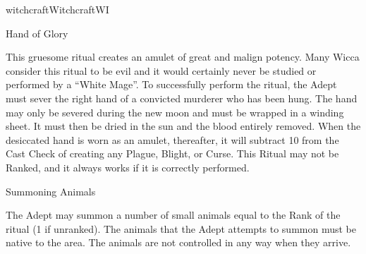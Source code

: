 \begin{college}[1.1]{witchcraft}{Witchcraft}{WI}
\begin{ritual}[R-4]{Hand of Glory}
\begin{effects}
This gruesome ritual creates an amulet of great and malign potency.
 Many Wicca consider this ritual to be evil and it would certainly
 never be studied or performed by a ``White Mage''.  To successfully
 perform the ritual, the Adept must sever the right hand of a
 convicted murderer who has been hung.  The hand may only be severed
 during the new moon and must be wrapped in a winding sheet.  It must
 then be dried in the sun and the blood entirely removed.  When the
 desiccated hand is worn as an amulet, thereafter, it will subtract 10
 from the Cast Check of creating any Plague, Blight, or Curse.  This
 Ritual may not be Ranked, and it always works if it is correctly
 performed.
\end{effects}
\end{ritual}

\begin{ritual}[R-5]{Summoning Animals}

\begin{effects}
The Adept may summon a number of small animals equal to the Rank of
the ritual (1 if unranked).  The animals that the Adept attempts to
summon must be native to the area.  The animals are not controlled in
any way when they arrive.
\end{effects}
\end{ritual}
\end{college}
